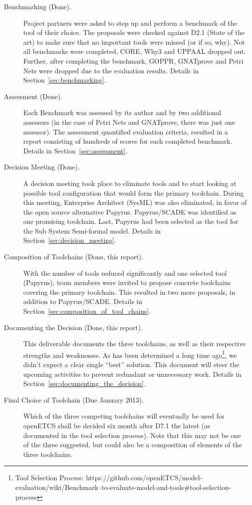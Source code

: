 \begin{description}

\item[Benchmarking (Done).] Project partners were asked to step up and perform a benchmark of the tool of their choice.  The proposals were checked against D2.1 (State of the art) to make sure that no important tools were missed (or if so, why).  Not all benchmarks were completed, CORE, Why3 and UPPAAL dropped out.  Further, after completing the benchmark, GOPPR, GNATprove and Petri Nets were dropped due to the evaluation results. Details in Section~\ref{sec:benchmarking}.

\item[Assessment (Done).] Each Benchmark was assessed by its author and by two additional assessors (in the case of Petri Nets and GNATprove, there was just one assessor).  The assessment quantified evaluation criteria, resulted in a report consisting of hundreds of scores for each completed benchmark. Details in Section~\ref{sec:assessment}.

\item[Decision Meeting (Done).] A decision meeting took place to eliminate tools and to start looking at possible tool configuration that would form the primary toolchain.  During this meeting, Enterprise Architect (SysML) was also eliminated, in favor of the open source alternative Papyrus.  Papyrus/SCADE was identified as one promising toolchain.  Last, Papyrus had been selected as the tool for the Sub System Semi-formal model.  Details in Section~\ref{sec:decision_meeting}.

\item[Composition of Toolchains (Done, this report).] With the number of tools reduced significantly and one selected tool (Papyrus), team members were invited to propose concrete toolchains covering the primary toolchain.  This resulted in two more proposals, in addition to Papyrus/SCADE. Details in Section~\ref{sec:composition_of_tool_chains}.

\item[Documenting the Decision (Done, this report).] This deliverable documents the three toolchains, as well as their respective strengths and weaknesses.  As has been determined a long time ago\footnote{Tool Selection Process: https://github.com/openETCS/model-evaluation/wiki/Benchmark--to-evaluate-model-and-tools\#tool-selection-process}, we didn't expect a clear single ``best'' solution.  This document will steer the upcoming activities to prevent redundant or unnecessary work.  Details in Section~\ref{sec:documenting_the_decision}.

\item[Final Choice of Toolchain (Due January 2013).] Which of the three competing toolchains will eventually be used for openETCS shall be decided six month after D7.1 the latest (as documented in the tool selection process).  Note that this may not be one of the three suggested, but could also be a composition of elements of the three toolchains.

\end{description}

